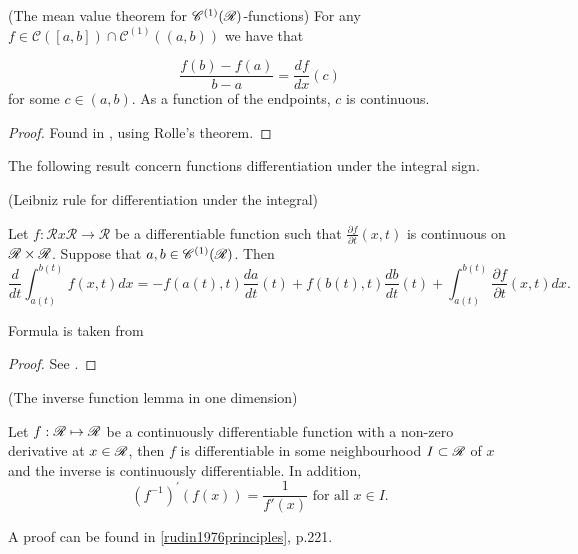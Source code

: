 \begin{definition}
\begin{definition}
\begin{theorem}(The mean value theorem for $\mathscr{C}^{(1)}(\mathscr{R})$-functions) \label{theorem:MVT}
	For any $f \in \mathscr{C}([a,b]) \cap \mathscr{C}^{(1)}((a,b))$ we have that 
	
	\begin{equation} \label{MVT}
		\frac{f(b) - f(a)}{b-a} = \frac{df}{dx}(c)
	\end{equation}
	for some $c \in (a,b)$. As a function of the endpoints, $c$ is continuous. 
\end{theorem}
\begin{proof}
	Found in \cite[p.142]{finney2000calculus}, using Rolle's theorem. 
\end{proof}


The following result concern functions  differentiation under the integral sign. 


\begin{theorem}(Leibniz rule for differentiation under the integral)
	
	\label{thm:leib_rule_int}
	Let  $f:\mathscr{R} x \mathscr{R} \rightarrow \mathscr{R}$ be a differentiable function such that $\frac{\partial f}{\partial t}(x,t)$
	is continuous on $\mathscr{R}\times\mathscr{R}$. Suppose that $a, b \in \mathscr{C}^{(1)}(\mathscr{R})$. Then
	\begin{equation} \label{LeibRule}
		\frac{d}{dt}\int_{a(t)}^{b(t)} f(x,t) dx = - f(a(t),t) \frac{da}{dt}(t) + f(b(t),t) \frac{db}{dt}(t) + \int_{a(t)}^{b(t)}\frac{\partial f}{\partial t}(x,t) dx. 
	\end{equation}
\end{theorem}

Formula is taken from 
\begin{proof}
	See \cite[p.255]{kaplan1912advanced}. 
\end{proof}

\begin{lemma}(The inverse function lemma in one dimension) \label{lem:IVT}
	
	Let $f : \mathscr{R} \mapsto \mathscr{R}$ be a continuously differentiable function with a non-zero derivative at $x \in \mathscr{R}$, then $f$ is differentiable in some neighbourhood $I \subset \mathscr{R}$ of $x$ and the inverse is continuously differentiable. In addition, 
	\begin{equation} \label{lem:IVT_formula}
		(f^{-1})^{'}(f(x))= \frac{1}{f'(x)} \text{ for all } x \in I. 
	\end{equation}  
\end{lemma}

A proof can be found in \eqref{rudin1976principles}, p.221. 


\end{definition}
\end{definition}
